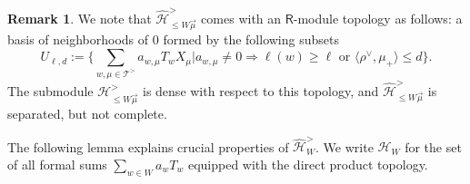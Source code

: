 \documentclass{amsart}
\newcommand{\Hecke}{\mathcal{H}}
\newcommand{\Ring}{\mathsf{R}}
\theoremstyle{definition}
\newtheorem{Rem}[Thm]{Remark}
\numberwithin{equation}{section}
\begin{document}
\begin{Rem}\label{rem:hat_topology}
We note that $\widehat{\Hecke}^>_{\leqslant W\vec{\mu}}$ comes with an $\Ring$-module topology as follows: a basis of neighborhoods of $0$ formed by the following subsets
$$U_{\ell,d}:=\{\sum_{w,\mu\in \mathcal{T}^>}a_{w,\mu}T_w X_\mu| a_{w,\mu}\neq 0\Rightarrow \ell(w)\geqslant \ell\text{ or }\langle\rho^\vee,\mu_+\rangle\leqslant d\}.$$
The submodule $\Hecke^>_{\leqslant W\vec{\mu}}$ is dense with respect to this topology, and  $\widehat{\Hecke}^>_{\leqslant W\vec{\mu}}$ is separated, but not complete.
\end{Rem}



The following lemma explains crucial properties of $\widehat{\Hecke}_W^{>}$. We write $\widehat{\Hecke}_W$ for the set of all formal sums $\sum_{w\in W}a_w T_w$ equipped with the direct product topology.
\end{document}
